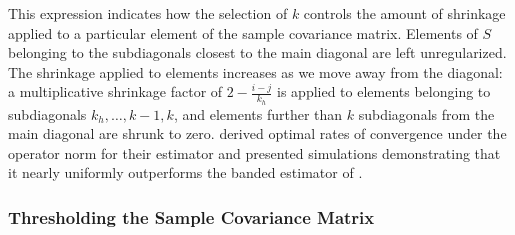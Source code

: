 \noindent
This expression indicates how the selection of $k$ controls the amount of shrinkage applied to a particular element of the sample covariance matrix. Elements of $S$ belonging to the subdiagonals closest to the main diagonal are left unregularized. The shrinkage applied to elements increases as we move away from the diagonal: a multiplicative shrinkage factor of $2 - \frac{i - j}{k_h}$ is applied to elements belonging to subdiagonals $k_h,\dots,k-1,k$, and elements further than $k$ subdiagonals from the main diagonal are shrunk to zero. \cite{cai2010optimal} derived optimal rates of convergence under the operator norm for their estimator and presented simulations demonstrating that it nearly uniformly outperforms the banded estimator of \cite{bickel2008regularized}.  


\subsubsection{Thresholding the Sample Covariance Matrix} \label{chapter-1-thresholding-estimators}


